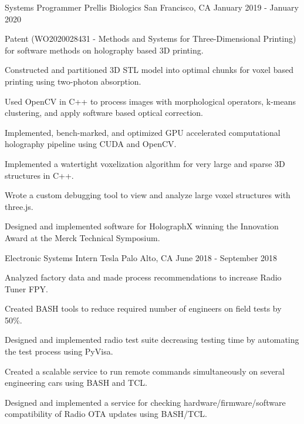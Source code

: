 \begin{cventries}


\cventry
{Systems Programmer} %
{Prellis Biologics} %
{San Francisco, CA} %
{January 2019 - January 2020} %
{ %
\begin{cvitems}
\item {Patent (WO2020028431 - Methods and Systems for Three-Dimensional Printing) for software methods on holography based 3D printing.}
\item {Constructed and partitioned 3D STL model into optimal chunks for voxel based printing using two-photon absorption.}
\item {Used OpenCV in C++ to process images with morphological operators, k-means clustering, and apply software based optical correction.}
\item {Implemented, bench-marked, and optimized GPU accelerated computational holography pipeline using CUDA and OpenCV.}
\item {Implemented a watertight voxelization algorithm for very large and sparse 3D structures in C++.}
\item {Wrote a custom debugging tool to view and analyze large voxel structures with three.js.}
\item {Designed and implemented software for HolographX winning the Innovation Award at the Merck Technical Symposium.}
\end{cvitems}
}




\cventry
{Electronic Systems Intern} %
{Tesla} %
{Palo Alto, CA} %
{June 2018 - September 2018} %
{ %
\begin{cvitems}
\item {Analyzed factory data and made process recommendations to increase Radio Tuner FPY.}
\item {Created BASH tools to reduce required number of engineers on field tests by 50\%.}
\item {Designed and implemented radio test suite decreasing testing time by automating the test process using PyVisa.}
\item {Created a scalable service to run remote commands simultaneously on several engineering cars using BASH and TCL.}
\item {Designed and implemented a service for checking hardware/firmware/software compatibility of Radio OTA updates using BASH/TCL.}
 \end{cvitems}
}


\end{cventries}
